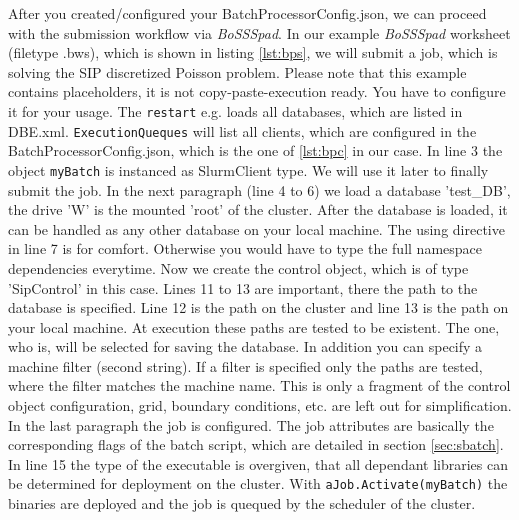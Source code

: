 \documentclass[11pt,twoside,a4paper]{fdyartcl}
\begin{document}
After you created/configured your BatchProcessorConfig.json, we can proceed with the submission workflow via \emph{BoSSSpad}.
In our example \emph{BoSSSpad} worksheet (filetype .bws), which is shown in listing \ref{lst:bps}, we will submit a job, which is solving the SIP discretized Poisson problem.
Please note that this example contains placeholders, it is not copy-paste-execution ready.
You have to configure it for your usage.
The \verb|restart| e.g. loads all databases, which are listed in DBE.xml.
\verb|ExecutionQueques| will list all clients, which are configured in the BatchProcessorConfig.json, which is the one of \ref{lst:bpc} in our case.
In line 3 the object \verb|myBatch| is instanced as SlurmClient type.
We will use it later to finally submit the job.
In the next paragraph (line 4 to 6) we load a database 'test\_DB', the drive 'W' is the mounted 'root' of the cluster.
After the database is loaded, it can be handled as any other database on your local machine.
The using directive in line 7 is for comfort. Otherwise you would have to type the full namespace dependencies everytime.
Now we create the control object, which is of type 'SipControl' in this case.
Lines 11 to 13 are important, there the path to the database is specified.
Line 12 is the path on the cluster and line 13 is the path on your local machine.
At execution these paths are tested to be existent.
The one, who is, will be selected for saving the database.
In addition you can specify a machine filter (second string).
If a filter is specified only the paths are tested, where the filter matches the machine name.
This is only a fragment of the control object configuration, grid, boundary conditions, etc. are left out for simplification.
In the last paragraph the job is configured.
The job attributes are basically the corresponding flags of the batch script, which are detailed in section \ref{sec:sbatch}.
In line 15 the type of the executable is overgiven, that all dependant libraries can be determined for deployment on the cluster. 
With \verb|aJob.Activate(myBatch)| the binaries are deployed and the job is quequed by the scheduler of the cluster. 

\noindent
\begin{minipage}{\linewidth}
	\begin{lstlisting}[caption={example of Job Submission via BoSSSpad}, label={lst:bps}]
	\end{lstlisting}
	
	
\end{minipage}
\end{document}
